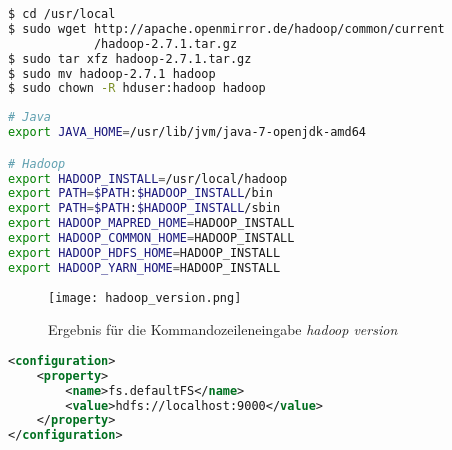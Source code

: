 \begin{lstlisting}[language=bash, caption={Herunterladen und entpacke von Hadoop}, label=lis:HerunterladenUndEntpacken]
$ cd /usr/local
$ sudo wget http://apache.openmirror.de/hadoop/common/current
            /hadoop-2.7.1.tar.gz
$ sudo tar xfz hadoop-2.7.1.tar.gz
$ sudo mv hadoop-2.7.1 hadoop
$ sudo chown -R hduser:hadoop hadoop
\end{lstlisting}

\newpage
\begin{lstlisting}[language=bash, caption={Umgebungsvariablen für Hadoop}, label=lis:Umgebungsvariablen]
# Java
export JAVA_HOME=/usr/lib/jvm/java-7-openjdk-amd64

# Hadoop
export HADOOP_INSTALL=/usr/local/hadoop
export PATH=$PATH:$HADOOP_INSTALL/bin
export PATH=$PATH:$HADOOP_INSTALL/sbin
export HADOOP_MAPRED_HOME=HADOOP_INSTALL
export HADOOP_COMMON_HOME=HADOOP_INSTALL
export HADOOP_HDFS_HOME=HADOOP_INSTALL
export HADOOP_YARN_HOME=HADOOP_INSTALL
\end{lstlisting}

\begin{figure}[h]
	\texttt{[image: hadoop\_version.png]}
	\caption{Ergebnis für die Kommandozeileneingabe \textit{hadoop version}}
	\label{fig:ErgebnisKomandozeileneingabe}
\end{figure}

\pagebreak
\begin{lstlisting}[language=XML, caption=Konfiguration in der core-site.xml, label=lis:KonfCoreSite]
<configuration>
	<property>
		<name>fs.defaultFS</name>
		<value>hdfs://localhost:9000</value>
	</property>
</configuration>
\end{lstlisting}